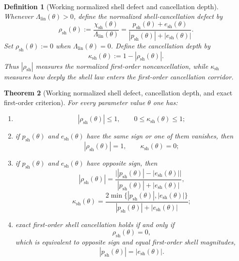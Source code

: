 \documentclass[12pt,a4paper]{article}
\newtheorem{theorem}{Theorem}[section]
\newtheorem{definition}[theorem]{Definition}
\begin{document}
\begin{definition}[Working normalized shell defect and cancellation depth]
Whenever $\Lambda_{\mathrm{lin}}(\theta)>0$, define the normalized shell-cancellation defect by
\[
 \rho_{\mathrm{sh}}(\theta):=\frac{\chi_{\mathrm{sh}}(\theta)}{\Lambda_{\mathrm{lin}}(\theta)}
 =\frac{p_{\mathrm{sh}}(\theta)+e_{\mathrm{sh}}(\theta)}{|p_{\mathrm{sh}}(\theta)|+|e_{\mathrm{sh}}(\theta)|}.
\]
Set $\rho_{\mathrm{sh}}(\theta):=0$ when $\Lambda_{\mathrm{lin}}(\theta)=0$. Define the cancellation depth by
\[
 \kappa_{\mathrm{sh}}(\theta):=1-|\rho_{\mathrm{sh}}(\theta)|.
\]
Thus $|\rho_{\mathrm{sh}}|$ measures the normalized first-order noncancellation, while $\kappa_{\mathrm{sh}}$ measures how deeply the shell law enters the first-order cancellation corridor.
\end{definition}

\begin{theorem}[Working normalized shell defect, cancellation depth, and exact first-order criterion]
For every parameter value $\theta$ one has:
\begin{enumerate}[leftmargin=2em,label=(\roman*)]
\item
\[
 |\rho_{\mathrm{sh}}(\theta)|\le 1,
 \qquad
 0\le \kappa_{\mathrm{sh}}(\theta)\le 1;
\]
\item if $p_{\mathrm{sh}}(\theta)$ and $e_{\mathrm{sh}}(\theta)$ have the same sign or one of them vanishes, then
\[
 |\rho_{\mathrm{sh}}(\theta)|=1,
 \qquad
 \kappa_{\mathrm{sh}}(\theta)=0;
\]
\item if $p_{\mathrm{sh}}(\theta)$ and $e_{\mathrm{sh}}(\theta)$ have opposite sign, then
\[
 |\rho_{\mathrm{sh}}(\theta)|
 =\frac{\bigl||p_{\mathrm{sh}}(\theta)|-|e_{\mathrm{sh}}(\theta)|\bigr|}{|p_{\mathrm{sh}}(\theta)|+|e_{\mathrm{sh}}(\theta)|},
\]
\[
 \kappa_{\mathrm{sh}}(\theta)
 =\frac{2\min\{|p_{\mathrm{sh}}(\theta)|,|e_{\mathrm{sh}}(\theta)|\}}{|p_{\mathrm{sh}}(\theta)|+|e_{\mathrm{sh}}(\theta)|};
\]
\item exact first-order shell cancellation holds if and only if
\[
 \rho_{\mathrm{sh}}(\theta)=0,
\]
which is equivalent to opposite sign and equal first-order shell magnitudes,
\[
 |p_{\mathrm{sh}}(\theta)|=|e_{\mathrm{sh}}(\theta)|.
\]
\end{enumerate}
\end{theorem}
\end{document}
